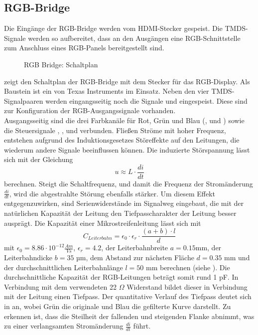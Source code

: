 \subsection{RGB-Bridge}
Die Eingänge der RGB-Bridge werden vom HDMI-Stecker gespeist. Die TMDS-Signale werden so aufbereitet, dass an den Ausgängen eine RGB-Schnittstelle zum Anschluss eines RGB-Panels bereitgestellt sind.
        \begin{figure}[htp]
        	\center
            \caption{RGB Bridge: Schaltplan}
            \label{fig:teilb_rgb_bridge_sch}
        \end{figure}
\newline        
{} zeigt den Schaltplan der RGB-Bridge mit dem Stecker für das RGB-Display. Als Baustein ist ein  von Texas Instruments im Einsatz. Neben den vier TMDS-Signalpaaren werden eingangsseitig noch die Signale  und  eingespeist. Diese sind zur Konfiguration der RGB-Ausgangssignale vorhanden. \\
Ausgangsseitig sind die drei Farbkanäle für Rot, Grün und Blau (,  und ) sowie die Steuersignale , ,  und  verbunden.
Fließen Ströme mit hoher Frequenz, entstehen aufgrund des Induktionsgesetzes Störeffekte auf den Leitungen, die wiederum andere Signale beeinflussen können. Die induzierte Störspannung lässt sich mit der Gleichung
%
\begin{equation}
u \approx L \cdot \frac{di}{dt}
\label{equ:z_0}
\end{equation}
%
berechnen. Steigt die Schaltfrequenz, und damit die Frequenz der Stromänderung $\frac{di}{dt}$, wird die abgestrahlte Störung ebenfalls stärker. Um diesem Effekt entgegenzuwirken, sind Serienwiderstände im Signalweg eingebaut, die mit der natürlichen Kapazität der Leitung den Tiefpasscharakter der Leitung besser ausprägt. Die Kapazität einer Mikrostreifenleitung lässt sich mit 
%
\begin{equation}
C_{Leiterbahn} = \epsilon_0 \cdot \epsilon_r \cdot \frac{(a+b) \cdot l}{d}
\label{equ:z_0}
\end{equation}
%
mit $\epsilon_0 = 8.86\cdot10^{-12} \frac{Am}{Vs}$, $\epsilon_r = 4.2$, der Leiterbahnbreite $a = 0.15 $mm, der Leiterbahndicke $b = 35$ µm, dem Abstand zur nächsten Fläche $d = 0.35$ mm und der durchschnittlichen Leiterbahnlänge $l = 50$ mm berechnen (siehe \cite{Gensicke2014}). Die durchschnittliche Kapazität der RGB-Leitungen beträgt somit rund 1 pF. In Verbindung mit dem verwendeten 22 $\Omega$ Widerstand bildet dieser in Verbindung mit der Leitung einen Tiefpass. Der quantitative Verlauf des Tiefpass deutet sich in  an, wobei Grün die originale und Blau die gefilterte Kurve darstellt. Zu erkennen ist, dass die Steilheit der fallenden und steigenden Flanke abnimmt, was zu einer verlangsamten Stromänderung $\frac{di}{dt}$ führt.
